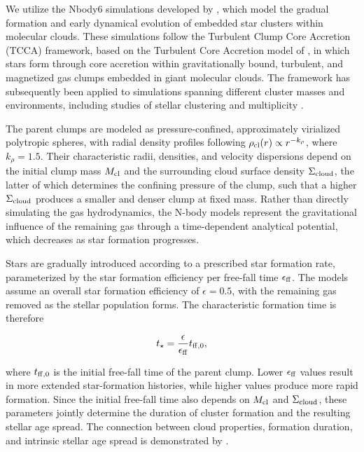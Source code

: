 \documentclass[linenumbers, twocolumn]{aastex631}
\begin{document}
We utilize the Nbody6 simulations developed by \citet{Farias2019}, which model the gradual formation and early dynamical evolution of embedded star clusters within molecular clouds. These simulations follow the Turbulent Clump Core Accretion (TCCA) framework, based on the Turbulent Core Accretion model of \citet{McKeeTan2003}, in which stars form through core accretion within gravitationally bound, turbulent, and magnetized gas clumps embedded in giant molecular clouds. The framework has subsequently been applied to simulations spanning different cluster masses and environments, including studies of stellar clustering and multiplicity \citep{Gautam2026}.

The parent clumps are modeled as pressure-confined, approximately virialized polytropic spheres, with radial density profiles following $\rho_{\rm cl}(r)\propto r^{-k_\rho}$, where $k_\rho=1.5$. Their characteristic radii, densities, and velocity dispersions depend on the initial clump mass $M_{\rm cl}$ and the surrounding cloud surface density $\Sigma_{\rm cloud}$, the latter of which determines the confining pressure of the clump, such that a higher $\Sigma_{\rm cloud}$ produces a smaller and denser clump at fixed mass. Rather than directly simulating the gas hydrodynamics, the N-body models represent the gravitational influence of the remaining gas through a time-dependent analytical potential, which decreases as star formation progresses.

Stars are gradually introduced according to a prescribed star formation rate, parameterized by the star formation efficiency per free-fall time $\epsilon_{\rm ff}$. The models assume an overall star formation efficiency of $\epsilon=0.5$, with the remaining gas removed as the stellar population forms. The characteristic formation time is therefore

\begin{equation}
    t_\star = \frac{\epsilon}{\epsilon_{\rm ff}}t_{\rm ff,0},
\end{equation}

where $t_{\rm ff,0}$ is the initial free-fall time of the parent clump. Lower $\epsilon_{\rm ff}$ values result in more extended star-formation histories, while higher values produce more rapid formation. Since the initial free-fall time also depends on $M_{\rm cl}$ and $\Sigma_{\rm cloud}$, these parameters jointly determine the duration of cluster formation and the resulting stellar age spread. The connection between cloud properties, formation duration, and intrinsic stellar age spread is demonstrated by \citet{Farias2019}.
\end{document}
